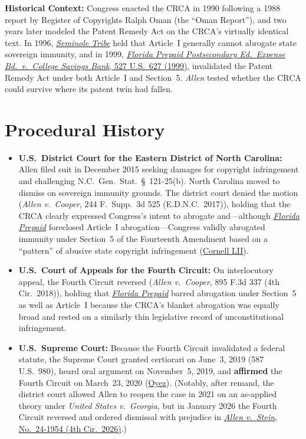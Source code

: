 \documentclass[12pt]{article}
\begin{document}
\textbf{Historical Context:} Congress enacted the CRCA in 1990 following a 1988 report by Register of Copyrights Ralph Oman (the ``Oman Report''), and two years later modeled the Patent Remedy Act on the CRCA's virtually identical text. In 1996, \href{https://supreme.justia.com/cases/federal/us/517/44/}{\textit{Seminole Tribe}} held that Article~I generally cannot abrogate state sovereign immunity, and in 1999, \href{https://supreme.justia.com/cases/federal/us/527/627/}{\textit{Florida Prepaid Postsecondary Ed.\ Expense Bd.\ v.\ College Savings Bank}, 527 U.S.\ 627 (1999)}, invalidated the Patent Remedy Act under both Article~I and Section~5. \textit{Allen} tested whether the CRCA could survive where its patent twin had fallen.

\section{Procedural History}
\begin{itemize}
  \item \textbf{U.S.\ District Court for the Eastern District of North Carolina:} Allen filed suit in December 2015 seeking damages for copyright infringement and challenging N.C.\ Gen.\ Stat.\ \S~121-25(b). North Carolina moved to dismiss on sovereign immunity grounds. The district court denied the motion (\textit{Allen v.\ Cooper}, 244 F.\ Supp.\ 3d 525 (E.D.N.C.\ 2017)), holding that the CRCA clearly expressed Congress's intent to abrogate and---although \href{https://supreme.justia.com/cases/federal/us/527/627/}{\textit{Florida Prepaid}} foreclosed Article~I abrogation---Congress validly abrogated immunity under Section~5 of the Fourteenth Amendment based on a ``pattern'' of abusive state copyright infringement (\href{https://www.law.cornell.edu/supremecourt/text/18-877}{Cornell LII}).
  \item \textbf{U.S.\ Court of Appeals for the Fourth Circuit:} On interlocutory appeal, the Fourth Circuit reversed (\textit{Allen v.\ Cooper}, 895 F.3d 337 (4th Cir.\ 2018)), holding that \href{https://supreme.justia.com/cases/federal/us/527/627/}{\textit{Florida Prepaid}} barred abrogation under Section~5 as well as Article~I because the CRCA's blanket abrogation was equally broad and rested on a similarly thin legislative record of unconstitutional infringement.
  \item \textbf{U.S.\ Supreme Court:} Because the Fourth Circuit invalidated a federal statute, the Supreme Court granted certiorari on June~3, 2019 (587 U.S.\ 980), heard oral argument on November~5, 2019, and \textbf{affirmed} the Fourth Circuit on March~23, 2020 (\href{https://www.oyez.org/cases/2019/18-877}{Oyez}). (Notably, after remand, the district court allowed Allen to reopen the case in 2021 on an as-applied theory under \textit{United States v.\ Georgia}, but in January 2026 the Fourth Circuit reversed and ordered dismissal with prejudice in \href{https://law.justia.com/cases/federal/appellate-courts/ca4/24-1954/24-1954-2026-01-23.html}{\textit{Allen v.\ Stein}, No.\ 24-1954 (4th Cir.\ 2026)}.)
\end{itemize}
\end{document}
